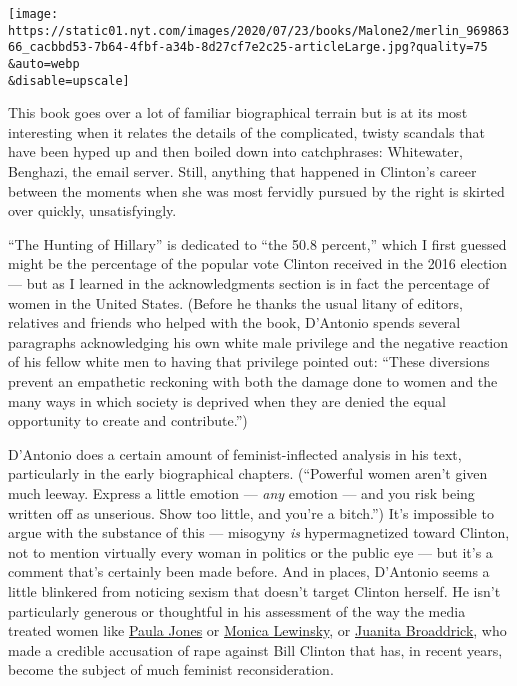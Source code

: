 \texttt{[image: https://static01.nyt.com/images/2020/07/23/books/Malone2/merlin\_96986366\_cacbbd53-7b64-4fbf-a34b-8d27cf7e2c25-articleLarge.jpg?quality=75\\\&auto=webp\\\&disable=upscale]}

This book goes over a lot of familiar biographical terrain but is at its
most interesting when it relates the details of the complicated, twisty
scandals that have been hyped up and then boiled down into catchphrases:
Whitewater, Benghazi, the email server. Still, anything that happened in
Clinton's career between the moments when she was most fervidly pursued
by the right is skirted over quickly, unsatisfyingly.

``The Hunting of Hillary'' is dedicated to ``the 50.8 percent,'' which I
first guessed might be the percentage of the popular vote Clinton
received in the 2016 election --- but as I learned in the
acknowledgments section is in fact the percentage of women in the United
States. (Before he thanks the usual litany of editors, relatives and
friends who helped with the book, D'Antonio spends several paragraphs
acknowledging his own white male privilege and the negative reaction of
his fellow white men to having that privilege pointed out: ``These
diversions prevent an empathetic reckoning with both the damage done to
women and the many ways in which society is deprived when they are
denied the equal opportunity to create and contribute.'')

D'Antonio does a certain amount of feminist-inflected analysis in his
text, particularly in the early biographical chapters. (``Powerful women
aren't given much leeway. Express a little emotion --- \emph{any}
emotion --- and you risk being written off as unserious. Show too
little, and you're a bitch.'') It's impossible to argue with the
substance of this --- misogyny \emph{is} hypermagnetized toward Clinton,
not to mention virtually every woman in politics or the public eye ---
but it's a comment that's certainly been made before. And in places,
D'Antonio seems a little blinkered from noticing sexism that doesn't
target Clinton herself. He isn't particularly generous or thoughtful in
his assessment of the way the media treated women like
\href{https://www.history.com/this-day-in-history/paula-jones-accuses-bill-clinton-of-sexual-harassment}{Paula
Jones} or
\href{https://www.cnn.com/ALLPOLITICS/1998/resources/lewinsky/timeline/}{Monica
Lewinsky}, or
\href{https://www.nytimes.com/1999/02/24/us/on-tortuous-route-sexual-assault-accusation-against-clinton-resurfaces.html}{Juanita
Broaddrick}, who made a credible accusation of rape against Bill Clinton
that has, in recent years, become the subject of much feminist
reconsideration.

